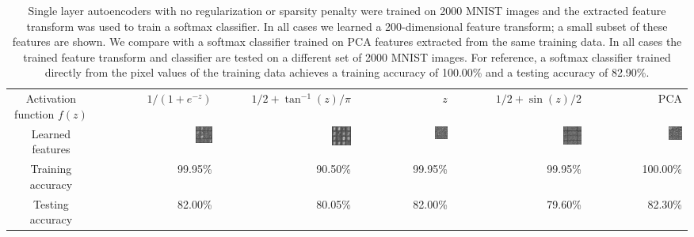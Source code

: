 \documentclass[twocolumn]{article}
\begin{document}
\begin{table}
  \centering
  \begin{tabular}{|C|DDDD|D|}
  \hline
  Activation function $f(z)$ & $1/(1+e^{-z})$ & $1/2+\tan^{-1}(z)/\pi$ & $z$ & $1/2+\sin(z)/2$ & PCA \\
  Learned features
    & \includegraphics[width=0.15\textwidth]{aeFigs/sigmoid.png}
    & \includegraphics[width=0.15\textwidth]{aeFigs/atan.png}
    & \includegraphics[width=0.15\textwidth]{aeFigs/id.png}
    & \includegraphics[width=0.15\textwidth]{aeFigs/sin.png}
    & \includegraphics[width=0.15\textwidth]{aeFigs/pca.png} \\
  Training accuracy & 99.95\% & 90.50\% & 99.95\% & 99.95\% & 100.00\% \\
  Testing accuracy & 82.00\% & 80.05\% & 82.00\% & 79.60\% & 82.30\% \\
  \hline
  \end{tabular}
  \caption{Single layer autoencoders with no regularization or sparsity penalty were trained on
    2000 MNIST images and the extracted feature transform was used to train a softmax classifier.
    In all cases we learned a 200-dimensional feature transform; a small subset of these features
    are shown. We compare with a softmax classifier trained on PCA features extracted from the same
    training data. In all cases the trained feature transform and classifier are tested on a different
    set of 2000 MNIST images. For reference, a softmax classifier trained directly from the pixel values
    of the training data achieves a training accuracy of 100.00\% and a testing accuracy of 82.90\%.}
  \label{table:noSparse}
\end{table}
\end{document}
